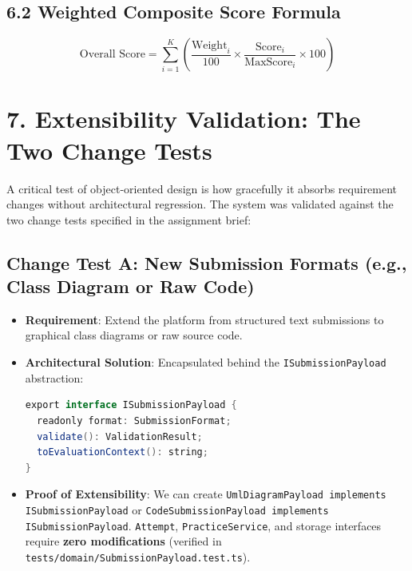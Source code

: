 \documentclass[10pt,a4paper]{article}
\begin{document}
\subsection{6.2 Weighted Composite Score Formula}
$$\text{Overall Score} = \sum_{i=1}^{K} \left( \frac{\text{Weight}_i}{100} \times \frac{\text{Score}_i}{\text{MaxScore}_i} \times 100 \right)$$

\section{7. Extensibility Validation: The Two Change Tests}

A critical test of object-oriented design is how gracefully it absorbs requirement changes without architectural regression. The system was validated against the two change tests specified in the assignment brief:

\subsection{Change Test A: New Submission Formats (e.g., Class Diagram or Raw Code)}
\begin{itemize}
  \item \textbf{Requirement}: Extend the platform from structured text submissions to graphical class diagrams or raw source code.
  \item \textbf{Architectural Solution}: Encapsulated behind the \texttt{ISubmissionPayload} abstraction:
\begin{lstlisting}[language=java]
export interface ISubmissionPayload {
  readonly format: SubmissionFormat;
  validate(): ValidationResult;
  toEvaluationContext(): string;
}
\end{lstlisting}
  \item \textbf{Proof of Extensibility}: We can create \texttt{UmlDiagramPayload implements ISubmissionPayload} or \texttt{CodeSubmissionPayload implements ISubmissionPayload}. \texttt{Attempt}, \texttt{PracticeService}, and storage interfaces require \textbf{zero modifications} (verified in \texttt{tests/domain/SubmissionPayload.test.ts}).
\end{itemize}
\end{document}
